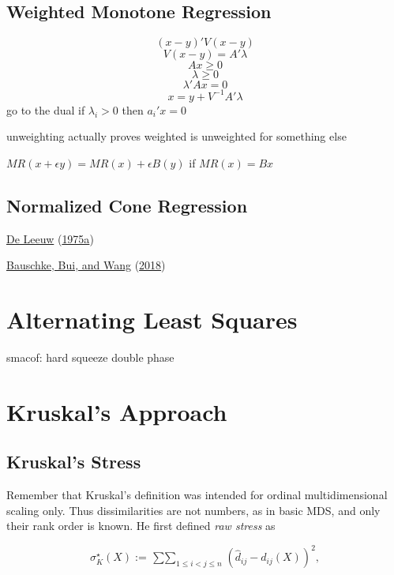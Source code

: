 \documentclass[
  12pt,
]{book}
\theoremstyle{definition}
\theoremstyle{definition}
\theoremstyle{definition}
\theoremstyle{definition}
\theoremstyle{remark}
\begin{document}
\hypertarget{mathweigmr}{%
\subsection{Weighted Monotone Regression}\label{mathweigmr}}

\[
(x-y)'V(x-y)
\]
\[V(x-y)=A'\lambda\]
\[Ax\geq 0\] \[\lambda\geq 0\] \[\lambda'Ax=0\] \[x=y+V^{-1}A'\lambda\]
go to the dual if \(\lambda_i>0\) then \(a_i'x=0\)

unweighting actually proves weighted is unweighted for something else

\(MR(x+\epsilon y)=MR(x)+\epsilon B(y)\) if \(MR(x)=Bx\)

\hypertarget{mathnorcone}{%
\subsection{Normalized Cone Regression}\label{mathnorcone}}

\protect\hyperlink{ref-deleeuw_U_75a}{De Leeuw} (\protect\hyperlink{ref-deleeuw_U_75a}{1975a})

\protect\hyperlink{ref-bauschke_bui_wang_18}{Bauschke, Bui, and Wang} (\protect\hyperlink{ref-bauschke_bui_wang_18}{2018})

\hypertarget{nmdsals}{%
\section{Alternating Least Squares}\label{nmdsals}}

smacof: hard squeeze double phase

\hypertarget{nmdskruskal}{%
\section{Kruskal's Approach}\label{nmdskruskal}}

\hypertarget{kruskals-stress-1}{%
\subsection{Kruskal's Stress}\label{kruskals-stress-1}}

Remember that Kruskal's definition was intended for ordinal multidimensional scaling only.
Thus dissimilarities are not numbers, as in basic MDS, and only their rank order is known. He first defined \emph{raw stress} as

\begin{equation}
\sigma^\star_K(X):=\mathop{\sum\sum}_{1\leq i<j\leq n} (\hat d_{ij}-d_{ij}(X))^2,
\label{eq:rawstress1}
\end{equation}
\end{document}
